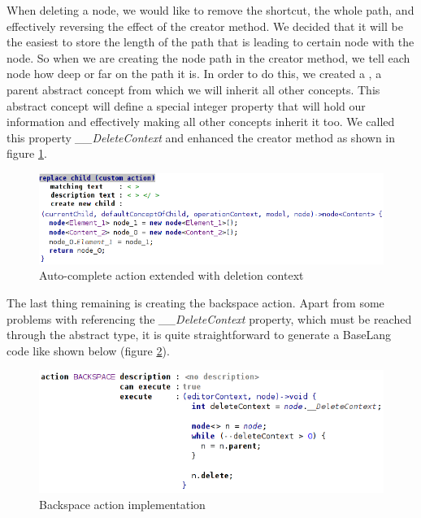 When deleting a node, we would like to remove the shortcut, the whole path, and effectively reversing the effect of the creator method. We decided that it will be the easiest to store the length of the path that is leading to certain node with the node. So when we are creating the node path in the creator method, we tell each node how deep or far on the path it is. In order to do this, we created a , a parent abstract concept from which we will inherit all other concepts. This abstract concept will define a special integer property that will hold our information and effectively making all other concepts inherit it too. We called this property \textit{{\_}{\_}DeleteContext} and enhanced the creator method as shown in figure \ref{fig:autocomplete_action_delete_context}.

\begin{figure}[h]
	\centering
	\includegraphics[width=\textwidth]{../img/autocomplete_action_delete_context.png}
	\caption{Auto-complete action extended with deletion context}
	\label{fig:autocomplete_action_delete_context}
\end{figure}

The last thing remaining is creating the backspace action. Apart from some problems with referencing the \textit{{\_}{\_}DeleteContext} property, which must be reached through the abstract  type, it is quite straightforward to generate a BaseLang code like shown below (figure \ref{fig:backspace_action}).

\begin{figure}[h]
	\centering
	\includegraphics[width=\textwidth]{../img/backspace_action.png}
	\caption{Backspace action implementation}
	\label{fig:backspace_action}
\end{figure}

